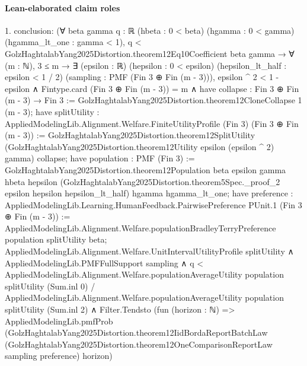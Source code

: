 \documentclass[10pt]{article}
\begin{document}
\paragraph{Lean-elaborated claim roles}\begin{ReviewVerbatim}
1. conclusion: (∀ {beta gamma q : ℝ} (hbeta : 0 < beta) (hgamma : 0 < gamma) (hgamma_lt_one : gamma < 1),
    q < GolzHaghtalabYang2025Distortion.theorem12Eq10Coefficient beta gamma →
      ∀ (m : ℕ),
        3 ≤ m →
          ∃ (epsilon : ℝ) (hepsilon : 0 < epsilon) (hepsilon_lt_half : epsilon < 1 / 2) (sampling :
            PMF (Fin 3 ⊕ Fin (m - 3))),
            epsilon ^ 2 < 1 - epsilon ∧
              Fintype.card (Fin 3 ⊕ Fin (m - 3)) = m ∧
                have collapse : Fin 3 ⊕ Fin (m - 3) → Fin 3 :=
                  GolzHaghtalabYang2025Distortion.theorem12CloneCollapse 1 (m - 3);
                have splitUtility :
                  AppliedModelingLib.Alignment.Welfare.FiniteUtilityProfile (Fin 3) (Fin 3 ⊕ Fin (m - 3)) :=
                  GolzHaghtalabYang2025Distortion.theorem12SplitUtility
                    (GolzHaghtalabYang2025Distortion.theorem12Utility epsilon (epsilon ^ 2) gamma) collapse;
                have population : PMF (Fin 3) :=
                  GolzHaghtalabYang2025Distortion.theorem12Population beta epsilon gamma hbeta hepsilon
                    (GolzHaghtalabYang2025Distortion.theorem5Spec._proof_2 epsilon hepsilon hepsilon_lt_half) hgamma
                    hgamma_lt_one;
                have preference :
                  AppliedModelingLib.Learning.HumanFeedback.PairwisePreference PUnit.{1} (Fin 3 ⊕ Fin (m - 3)) :=
                  AppliedModelingLib.Alignment.Welfare.populationBradleyTerryPreference population splitUtility beta;
                AppliedModelingLib.Alignment.Welfare.UnitIntervalUtilityProfile splitUtility ∧
                  AppliedModelingLib.PMFFullSupport sampling ∧
                    q <
                        AppliedModelingLib.Alignment.Welfare.populationAverageUtility population splitUtility
                            (Sum.inl 0) /
                          AppliedModelingLib.Alignment.Welfare.populationAverageUtility population splitUtility
                            (Sum.inl 2) ∧
                      Filter.Tendsto
                        (fun (horizon : ℕ) =>
                          AppliedModelingLib.pmfProb
                            (GolzHaghtalabYang2025Distortion.theorem12IidBordaReportBatchLaw
                              (GolzHaghtalabYang2025Distortion.theorem12OneComparisonReportLaw sampling preference)
                              horizon)

\end{ReviewVerbatim}
\end{document}
